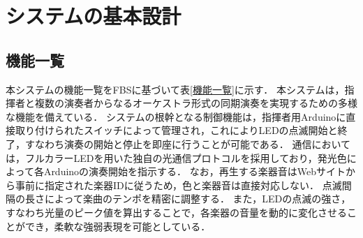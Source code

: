 \documentclass[lualatex,book,openany,paper=a4paper,jafontsize=11.5pt,jafontscale=1.05]{jlreq}
\begin{document}
\begin{table}
 \begin{center}
   \caption{リスク管理}
   \label{リスク管理}
 \end{center}
\end{table}


\chapter{システムの基本設計}


\section{機能一覧}
本システムの機能一覧をFBSに基づいて表\ref{機能一覧}に示す．
本システムは，指揮者と複数の演奏者からなるオーケストラ形式の同期演奏を実現するための多様な機能を備えている．
システムの根幹となる制御機能は，指揮者用Arduinoに直接取り付けられたスイッチによって管理され，これによりLEDの点滅開始と終了，すなわち演奏の開始と停止を即座に行うことが可能である．
通信においては，フルカラーLEDを用いた独自の光通信プロトコルを採用しており，発光色によって各Arduinoの演奏開始を指示する．
なお，再生する楽器音はWebサイトから事前に指定された楽器IDに従うため，色と楽器音は直接対応しない．
点滅間隔の長さによって楽曲のテンポを精密に調整する．
また，LEDの点滅の強さ，すなわち光量のピーク値を算出することで，各楽器の音量を動的に変化させることができ，柔軟な強弱表現を可能としている．
\end{document}
